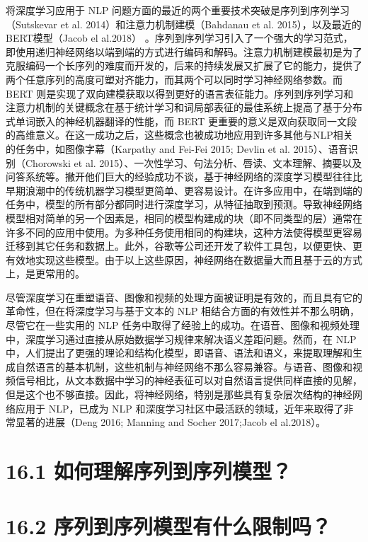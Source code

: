 将深度学习应用于 NLP
问题方面的最近的两个重要技术突破是序列到序列学习（Sutskevar et al.
2014）和注意力机制建模（Bahdanau et al. 2015），以及最近的
BERT模型（Jacob el al.2018）
。序列到序列学习引入了一个强大的学习范式，即使用递归神经网络以端到端的方式进行编码和解码。注意力机制建模最初是为了克服编码一个长序列的难度而开发的，后来的持续发展又扩展了它的能力，提供了两个任意序列的高度可塑对齐能力，而其两个可以同时学习神经网络参数。而
BERT
则是实现了双向建模获取以得到更好的语言表征能力。序列到序列学习和注意力机制的关键概念在基于统计学习和词局部表征的最佳系统上提高了基于分布式单词嵌入的神经机器翻译的性能，而
BERT
更重要的意义是双向获取同一文段的高维意义。在这一成功之后，这些概念也被成功地应用到许多其他与NLP相关的任务中，如图像字幕（Karpathy
and Fei-Fei 2015; Devlin et al. 2015）、语音识别（Chorowski et al.
2015）、一次性学习、句法分析、唇读、文本理解、摘要以及问答系统等。撇开他们巨大的经验成功不谈，基于神经网络的深度学习模型往往比早期浪潮中的传统机器学习模型更简单、更容易设计。在许多应用中，在端到端的任务中，模型的所有部分都同时进行深度学习，从特征抽取到预测。导致神经网络模型相对简单的另一个因素是，相同的模型构建成的块（即不同类型的层）通常在许多不同的应用中使用。为多种任务使用相同的构建块，这种方法使得模型更容易迁移到其它任务和数据上。此外，谷歌等公司还开发了软件工具包，以便更快、更有效地实现这些模型。由于以上这些原因，神经网络在数据量大而且基于云的方式上，是更常用的。

尽管深度学习在重塑语音、图像和视频的处理方面被证明是有效的，而且具有它的革命性，但在将深度学习与基于文本的
NLP 相结合方面的有效性并不那么明确，尽管它在一些实用的 NLP
任务中取得了经验上的成功。在语音、图像和视频处理中，深度学习通过直接从原始数据学习规律来解决语义差距问题。然而，在
NLP
中，人们提出了更强的理论和结构化模型，即语音、语法和语义，来提取理解和生成自然语言的基本机制，这些机制与神经网络不那么容易兼容。与语音、图像和视频信号相比，从文本数据中学习的神经表征可以对自然语言提供同样直接的见解，但是这个也不够直接。因此，将神经网络，特别是那些具有复杂层次结构的神经网络应用于
NLP，已成为 NLP
和深度学习社区中最活跃的领域，近年来取得了非常显著的进展（Deng 2016;
Manning and Socher 2017;Jacob el al.2018）。

\section{16.1
如何理解序列到序列模型？}\label{ux5982ux4f55ux7406ux89e3ux5e8fux5217ux5230ux5e8fux5217ux6a21ux578b}

\section{16.2
序列到序列模型有什么限制吗？}\label{ux5e8fux5217ux5230ux5e8fux5217ux6a21ux578bux6709ux4ec0ux4e48ux9650ux5236ux5417}

